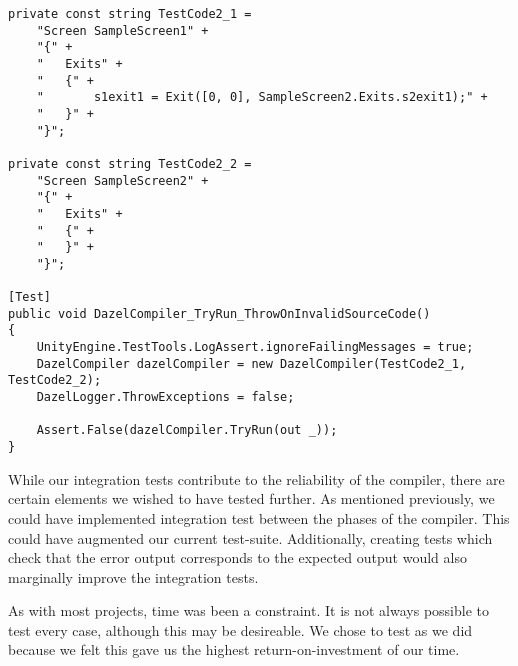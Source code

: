 \begin{lstlisting}[language=CSharp, caption={\dazel{} compiler integration test verifying that invalid source code results in an error}, label={lst:integrationTest2}, escapechar=|]
private const string TestCode2_1 =
    "Screen SampleScreen1" +
    "{" +
    "   Exits" +
    "   {" +
    "       s1exit1 = Exit([0, 0], SampleScreen2.Exits.s2exit1);" + 
    "   }" +
    "}";

private const string TestCode2_2 = 
    "Screen SampleScreen2" +
    "{" +
    "   Exits" +
    "   {" +
    "   }" +
    "}";

[Test]
public void DazelCompiler_TryRun_ThrowOnInvalidSourceCode()
{
    UnityEngine.TestTools.LogAssert.ignoreFailingMessages = true;
    DazelCompiler dazelCompiler = new DazelCompiler(TestCode2_1, TestCode2_2);
    DazelLogger.ThrowExceptions = false;
    
    Assert.False(dazelCompiler.TryRun(out _));
}
\end{lstlisting}

While our integration tests contribute to the reliability of the \dazel{} compiler, there are certain elements we wished to have tested further. As mentioned previously, we could have implemented integration test between the phases of the compiler. This could have augmented our current test-suite. Additionally, creating tests which check that the error output corresponds to the expected output would also marginally improve the integration tests.

As with most projects, time was been a constraint. It is not always possible to test every case, although this may be desireable. We chose to test as we did because we felt this gave us the highest return-on-investment of our time.